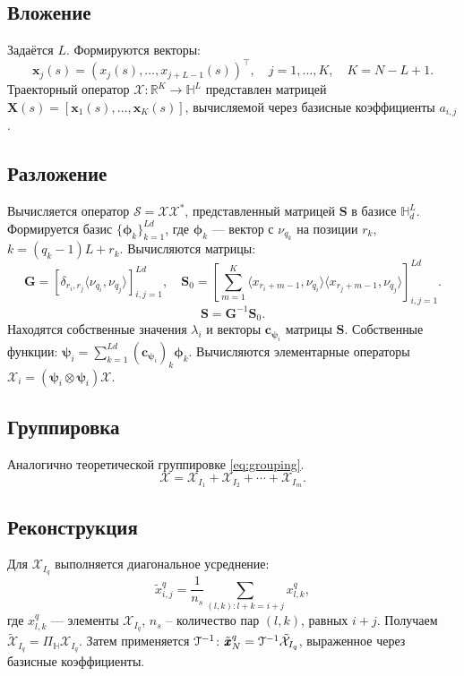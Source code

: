 \documentclass[12pt, specialist, subf
]{disser}
\theoremstyle{definition}
\begin{document}
\subsection*{Вложение}
Задаётся \( L\). Формируются векторы:
\[
	\pmb{x}_j(s) = (x_j(s), \dots, x_{j+L-1}(s))^\top, \quad j=1,\dots,K, \quad K=N-L+1.
\]
Траекторный оператор \( \mathcal{X}: \mathbb{R}^K \to \mathbb{H}^L \) представлен матрицей \( \mathbf{X}(s) = [\pmb{x}_1(s), \dots, \pmb{x}_K(s)] \), вычисляемой через базисные коэффициенты \( a_{i,j} \).

\subsection*{Разложение}

Вычисляется оператор \( \mathcal{S} = \mathcal{X} \mathcal{X}^* \), представленный матрицей \( \mathbf{S} \) в базисе \( \mathbb{H}_d^L \). Формируется базис \( \{\mathbf{\phi}_k\}_{k=1}^{Ld} \), где \( \mathbf{\phi}_k \) — вектор с \( \nu_{q_k} \) на позиции \( r_k \), \( k = (q_k-1)L + r_k \). Вычисляются матрицы:
\[
	\mathbf{G} = [\delta_{r_i,r_j} \langle \nu_{q_i}, \nu_{q_j} \rangle]_{i,j=1}^{Ld}, \quad \mathbf{S}_0 = \left[\sum_{m=1}^K \langle x_{r_i+m-1}, \nu_{q_i} \rangle \langle x_{r_j+m-1}, \nu_{q_j} \rangle\right]_{i,j=1}^{Ld}.
\]
\[
	\mathbf{S} = \mathbf{G}^{-1} \mathbf{S}_0.
\]
Находятся собственные значения \( \lambda_i \) и векторы \( \mathbf{c}_{\mathbf{\psi}_i} \) матрицы \( \mathbf{S} \). Собственные функции: \( \mathbf{\psi}_i = \sum_{k=1}^{Ld} (\mathbf{c}_{\mathbf{\psi}_i})_k \mathbf{\phi}_k \). Вычисляются элементарные операторы \( \mathcal{X}_i = (\mathbf{\psi}_i \otimes \mathbf{\psi}_i) \mathcal{X} \).

\subsection*{Группировка}
Аналогично теоретической группировке \eqref{eq:grouping}.
\begin{equation*}
	\mathcal{X}=\mathcal{X}_{I_1}+\mathcal{X}_{I_2}+\cdots+\mathcal{X}_{I_m}.
\end{equation*}

\subsection*{Реконструкция}
Для \( \mathcal{X}_{I_q} \) выполняется диагональное усреднение:
\[
	\tilde{x}_{i,j}^q = \frac{1}{n_s} \sum_{(l,k): l+k=i+j} x_{l,k}^q,
\]
где \( x_{l,k}^q \) — элементы \( \mathcal{X}_{I_q} \), $n_s$ -- количество пар $(l, k)$, равных $i+j$.  Получаем \( \tilde{\mathcal{X}}_{I_q} = \Pi_\mathbb{H} \mathcal{X}_{I_q} \). Затем применяется \( \EuScript{T}^{-1} \): \( \tilde{\pmb{x}}_N^q = \EuScript{T}^{-1} \tilde{\mathcal{X}}_{I_q} \), выраженное через базисные коэффициенты.
\end{document}
